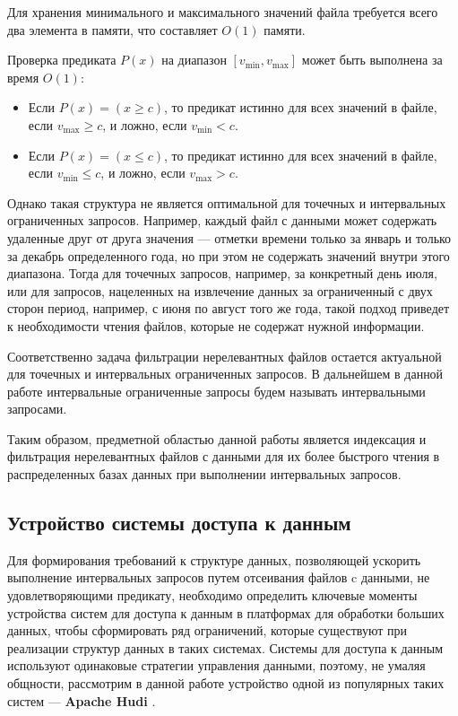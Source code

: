 Для хранения минимального и максимального значений файла требуется всего два элемента в памяти, что составляет $O(1)$ памяти.

Проверка предиката $P(x)$ на диапазон $[v_{\min}, v_{\max}]$ может быть выполнена за время $O(1)$:
\begin{itemize}
    \item Если $P(x) = (x \geq c)$, то предикат истинно для всех значений в файле, если $v_{\max} \geq c$, и ложно, если $v_{\min} < c$.
    \item Если $P(x) = (x \leq c)$, то предикат истинно для всех значений в файле, если $v_{\min} \leq c$, и ложно, если $v_{\max} > c$.
\end{itemize}
\thmp

Однако такая структура не является оптимальной для точечных и интервальных ограниченных запросов. Например, каждый файл с данными может содержать удаленные друг от друга значения --- отметки времени только за январь и только за декабрь определенного года, но при этом не содержать значений внутри этого диапазона. Тогда для точечных запросов, например, за конкретный день июля, или для запросов, нацеленных на извлечение данных за ограниченный с двух сторон период, например, с июня по август того же года, такой подход приведет к необходимости чтения файлов, которые не содержат нужной информации.

Соответственно задача фильтрации нерелевантных файлов остается актуальной для точечных и интервальных ограниченных запросов. В дальнейшем в данной работе интервальные ограниченные запросы будем называть интервальными запросами.

Таким образом, предметной областью данной работы является индексация и фильтрация нерелевантных файлов с данными для их более быстрого чтения в распределенных базах данных при выполнении интервальных запросов.


\subsection{Устройство системы доступа к данным}

Для формирования требований к структуре данных, позволяющей ускорить выполнение интервальных запросов путем отсеивания файлов c данными, не удовлетворяющими предикату, необходимо определить ключевые моменты устройства систем для доступа к данным в платформах для обработки больших данных, чтобы сформировать ряд ограничений, которые существуют при реализации структур данных в таких системах. Системы для доступа к данным используют одинаковые стратегии управления данными, поэтому, не умаляя общности, рассмотрим в данной работе устройство одной из популярных таких систем --- \textbf{Apache Hudi} \cite{Analyzing_and_comparing_lakehouse_storage_systems}.

